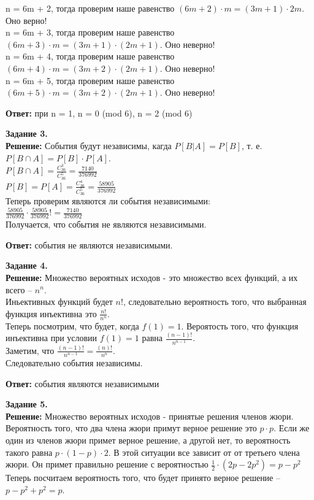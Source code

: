 \documentclass[12pt,a4paper]{scrartcl}
\begin{document}
		n = 6m + 2, тогда проверим наше равенство $(6m + 2) \cdot m = (3m + 1) \cdot 2m$. Оно верно! \\
		n = 6m + 3, тогда проверим наше равенство $(6m + 3) \cdot m = (3m + 1) \cdot (2m + 1)$. Оно неверно! \\
		n = 6m + 4, тогда проверим наше равенство $(6m + 4) \cdot m = (3m + 2) \cdot (2m + 1)$. Оно неверно! \\
		n = 6m + 5, тогда проверим наше равенство $(6m + 5) \cdot m = (3m + 2) \cdot (2m + 1)$. Оно неверно! \\
	\begin{flushright}
		\textbf{Ответ:} при n = 1, n = 0 (mod 6), n = 2 (mod 6)

	\end{flushright}
	\textbf{Задание 3.} 
	\\
	\textbf{Решение:} События будут независимы, кагда $P[B|A] = P[B]$, т. е. \\ 
	$P[B \cap A] = P[B] \cdot P[A]$.\\
	$P[B \cap A] = \frac{C_{36}^{3}}{C_{36}^{5}} = \frac{7140}{376992}$\\ 
	$P[B] = P[A] = \frac{C_{36}^{4}}{C_{36}^{5}} = \frac{58905}{376992}$\\
	Теперь проверим являются ли события независимыми: \\
	$\frac{58905}{376992} \cdot \frac{58905}{376992} != \frac{7140}{376992}$ \\
	Получается, что события не являются независимыми.
	\begin{flushright}	
		\textbf{Ответ:} события не являются независимыми.
	\end{flushright}
	\noindent
	\textbf{Задание 4.} 
	\\
	\textbf{Решение:} Множество вероятных исходов - это множество всех функций, а их всего -- $n^n$.\\
	Иньективных функций будет $n!$, следовательно вероятность того, что выбранная функция инъективна это $\frac{n!}{n^n}$. \\
	Теперь посмотрим, что будет, когда $f(1) = 1$. Вероятость того, что функция инъективна при условии $f(1) = 1$ равна $\frac{(n - 1)!}{n^{n - 1}}$. \\
	Заметим, что $\frac{(n - 1)!}{n^{n - 1}} = \frac{(n)!}{n^{n}}$.\\
	Следовательно события независимы.
	\begin{flushright}
		\textbf{Ответ:} события являются независимыми 
	\end{flushright}
	\textbf{Задание 5.} 
	\\
	\textbf{Решение:} Множество вероятных исходов - принятые решения членов жюри. \\
	Вероятность того, что два члена жюри примут верное решение это $p \cdot p$. Если же один из членов жюри примет верное решение, а другой нет, то вероятность такого равна $p \cdot (1 - p) \cdot 2$. В этой ситуации все зависит от от третьего члена жюри. Он примет правильно решение с вероятностью $\frac{1}{2} \cdot (2p - 2p^2) = p - p^2$\\
	Теперь посчитаем вероятность того, что будет принято верное решение -- \\ $p - p^2 + p^2 = p$.
	
\end{document}
